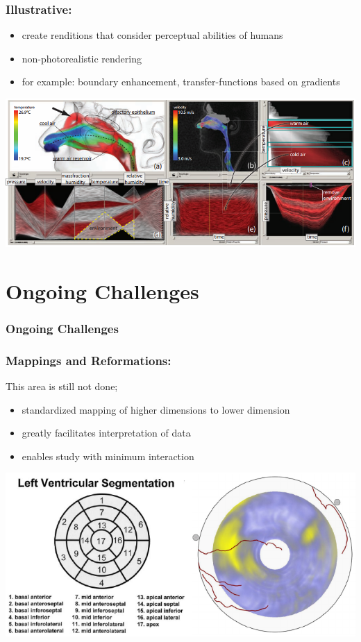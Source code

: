 \documentclass{beamer}
\begin{document}
\begin{frame}
	\frametitle{Illustrative:} %
	\begin{itemize}
		\item create renditions that consider perceptual abilities of humans
		\item non-photorealistic rendering
		\item for example: boundary enhancement, transfer-functions based on
gradients
	\end{itemize}
	\includegraphics[width=\textwidth]{images/nose}
\end{frame}

\section{Ongoing Challenges}

\begin{frame}
	\frametitle{Ongoing Challenges}
\end{frame}

\begin{frame}
	\frametitle{Mappings and Reformations:}
		This area is still not done;
	\begin{itemize}
		\item standardized mapping of higher dimensions to lower dimension
		\item greatly facilitates interpretation of data
		\item enables study with minimum interaction
	\end{itemize}
	\includegraphics[width=\textwidth]{images/heart}
\end{frame}
\end{document}
